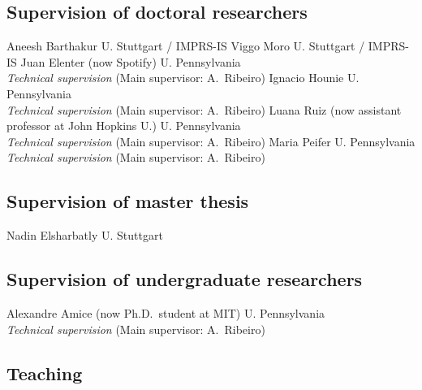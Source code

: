 \documentclass{cvlfoc}
\begin{document}
\subsection*{Supervision of doctoral researchers}

\begin{entrydate}
		{Aneesh Barthakur \hfill U. Stuttgart / IMPRS-IS}
		{Viggo Moro \hfill U. Stuttgart / IMPRS-IS}
		{Juan Elenter {\small (now Spotify)}
		\hfill U. Pennsylvania\\
			\emph{Technical supervision} \hfill(Main supervisor: A.\ Ribeiro)}
		{Ignacio Hounie \hfill U. Pennsylvania\\
			\emph{Technical supervision} \hfill(Main supervisor: A.\ Ribeiro)}
		{Luana Ruiz {\small (now assistant professor at John Hopkins U.)}
			\hfill U. Pennsylvania\\
			\emph{Technical supervision} \hfill(Main supervisor: A.\ Ribeiro)}
		{Maria Peifer \hfill U. Pennsylvania\\
			\emph{Technical supervision} \hfill(Main supervisor: A.\ Ribeiro)}
\end{entrydate}


\subsection*{Supervision of master thesis}

\begin{entrydate}
		{Nadin Elsharbatly \hfill U. Stuttgart}
\end{entrydate}


\subsection*{Supervision of undergraduate researchers}

\begin{entrydate}
		{Alexandre Amice {\small (now Ph.D.\ student at MIT)}
		\hfill U. Pennsylvania\\
		\emph{Technical supervision} \hfill(Main supervisor: A.\ Ribeiro)}
\end{entrydate}


\subsection*{Teaching}
\end{document}
